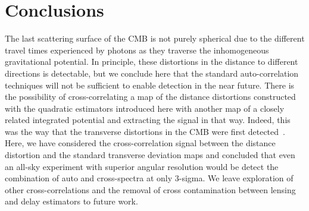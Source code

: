 \documentclass[prd,amsmath,amssymb,floatfix,superscriptaddress,nofootinbib,twocolumn]{revtex4-1}
\def\be{\begin{equation}}
\def\ee{\end{equation}}
\def\bea{\begin{eqnarray}}
\def\eea{\end{eqnarray}}
\newcommand{\sfig}[2]{
\texttt{[image: ../plots/\#1]}
        }
\newcommand{\Sfig}[2]{
   \begin{figure}[thbp]
   \begin{center}
    \sfig{#1.pdf}{\columnwidth}
    \caption{{\small #2}}
    \label{fig:#1}
     \end{center}
   \end{figure}
}
\begin{document}

\section{Conclusions}

The last scattering surface of the CMB is not purely spherical due to the different travel times experienced by photons as they traverse the inhomogeneous gravitational potential. In principle, these distortions in the distance to different directions is detectable, but we conclude here that the standard auto-correlation techniques will not be sufficient to enable detection in the near future. There is the possibility of cross-correlating a map of the distance distortions constructed with the quadratic estimators introduced here with another map of a closely related integrated potential and extracting the signal in that way. Indeed, this was the way that the transverse distortions in the CMB were first detected~\cite{Smith:2007rg}. Here, we have considered  the cross-correlation signal between the distance distortion and the standard transverse deviation maps and concluded that even an all-sky experiment with superior angular resolution would be detect the combination of auto and cross-spectra at only 3-sigma. We leave exploration of other cross-correlations and the removal of cross contamination between lensing and delay estimators to future work.




\end{document}
